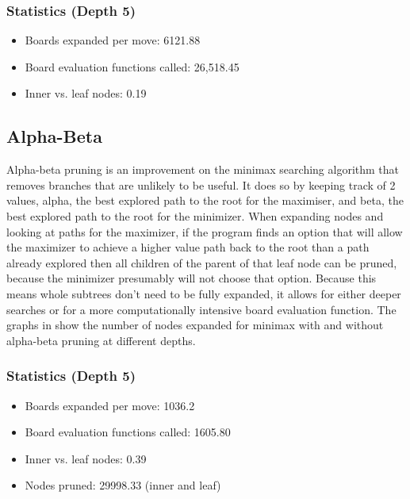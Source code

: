 \documentclass{article}
\begin{document}
\subsubsection{Statistics (Depth 5)}
\begin{itemize}
	\item Boards expanded per move: 6121.88
	\item Board evaluation functions called: 26,518.45
	\item Inner vs. leaf nodes: 0.19
\end{itemize}

\subsection{Alpha-Beta}

Alpha-beta pruning is an improvement on the minimax searching algorithm that
removes branches that are unlikely to be useful. It does so by keeping track of
2 values, alpha, the best explored path to the root for the maximiser, and
beta, the best explored path to the root for the minimizer. When expanding
nodes and looking at paths for the maximizer, if the program finds an option
that will allow the maximizer to achieve a higher value path back to the root
than a path already explored then all children of the parent of that leaf node
can be pruned, because the minimizer presumably will not choose that option.
Because this means whole subtrees don’t need to be fully expanded, it allows
for either deeper searches  or for a more computationally intensive board
evaluation function. The graphs in  show the number of nodes expanded for
minimax with and without alpha-beta pruning at different depths.

\subsubsection{Statistics (Depth 5)}
\begin{itemize}
	\item Boards expanded per move: 1036.2
	\item Board evaluation functions called: 1605.80
	\item Inner vs. leaf nodes: 0.39
    \item Nodes pruned: 29998.33 (inner and leaf)
\end{itemize}
\end{document}

